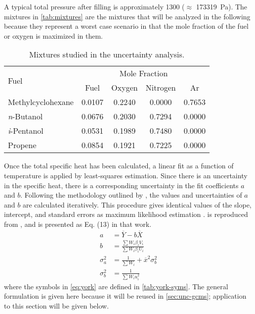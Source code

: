 \documentclass[12pt, letterpaper]{article}
\begin{document}
A typical total pressure after filling is
approximately \SI{1300}{\torr} ($\approx$ \SI{173319}{\pascal}). The mixtures in
\autoref{tab:mixtures} are the mixtures that will be analyzed in the
following because they represent a worst case scenario in that the mole
fraction of the fuel or oxygen is maximized in them.

\begin{table}
\centering
\caption{Mixtures studied in the uncertainty analysis.}
\label{tab:mixtures}
\begin{tabular}{l *{4}{c}}
    \toprule
    \multirow{2}[0]{*}{Fuel} & \multicolumn{4}{c}{Mole Fraction} \\
         & Fuel & Oxygen & Nitrogen & Ar \\
    \midrule
    Methylcyclohexane   & 0.0107 & 0.2240 & 0.0000 & 0.7653 \\
    \textit{n}-Butanol  & 0.0676 & 0.2030 & 0.7294 & 0.0000 \\
    \textit{i}-Pentanol & 0.0531 & 0.1989 & 0.7480 & 0.0000 \\
    Propene             & 0.0854 & 0.1921 & 0.7225 & 0.0000 \\
    \bottomrule
    \end{tabular}
\end{table}

Once the total specific heat has been calculated, a linear fit as a function
of temperature is applied by least-squares estimation. Since there is an uncertainty
in the specific heat, there is a corresponding uncertainty in the fit
coefficients $a$ and $b$. Following the methodology outlined by
\textcite{York2004}, the values and uncertainties of $a$ and $b$
are calculated iteratively. This procedure gives identical values of the
slope, intercept, and standard errors as maximum likelihood estimation \cite{York2004}.
 is reproduced from \textcite{York2004}, and is presented
as Eq. (13) in that work.
%
\begin{subequations}
\label{eq:york}
\begin{align}
a &= \overline{Y} - b\overline{X}  \label{eq:intercept}\\
b &= \frac{\sum W_i \beta_i V_i}{\sum W_i \beta_i U_i} \label{eq:slope}\\
\sigma_a^2 &= \frac{1}{\sum W_i} + \overline{x}^2\sigma_b^2 \label{eq:unc-intercept}\\
\sigma_b^2 &= \frac{1}{\sum W_i u_i^2} \label{eq:unc-slope}
\end{align}
\end{subequations}
%
where the symbols in \autoref{eq:york} are defined in \autoref{tab:york-syms}.
The general formulation is given here because it will be reused in
\autoref{sec:unc-gcms}; application to this section will
be given below.
\end{document}
